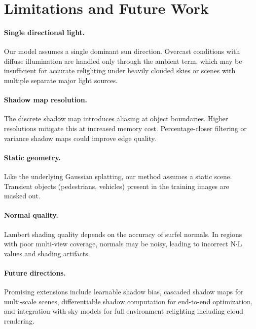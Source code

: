 \section{Limitations and Future Work}
\label{sec:limitations}

\paragraph{Single directional light.}
Our model assumes a single dominant sun direction.
Overcast conditions with diffuse illumination are handled only through the ambient term, which may be insufficient for accurate relighting under heavily clouded skies or scenes with multiple separate major light sources.

\paragraph{Shadow map resolution.}
The discrete shadow map introduces aliasing at object boundaries.
Higher resolutions mitigate this at increased memory cost.
Percentage-closer filtering or variance shadow maps could improve edge quality.

\paragraph{Static geometry.}
Like the underlying Gaussian splatting, our method assumes a static scene.
Transient objects (pedestrians, vehicles) present in the training images are masked out.

\paragraph{Normal quality.}
Lambert shading quality depends on the accuracy of surfel normals.
In regions with poor multi-view coverage, normals may be noisy, leading to incorrect N$\cdot$L values and shading artifacts.

\paragraph{Future directions.}
Promising extensions include learnable shadow bias, cascaded shadow maps for multi-scale scenes, differentiable shadow computation for end-to-end optimization, and integration with sky models for full environment relighting including cloud rendering.